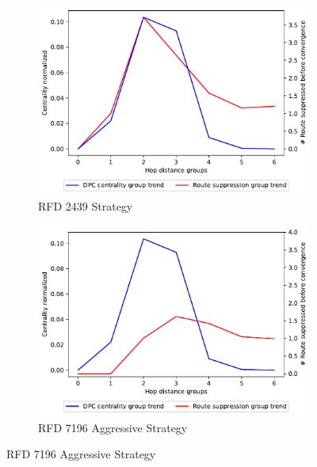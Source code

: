 \begin{figure}[h]
     \centering
     \begin{subfigure}[b]{0.49\textwidth}
         \centering
         \includegraphics[width=\textwidth]{images/RFD/miceVSelephants/mice/cisco_1000_RFD_nodeConvergence_centVSsup_trend.pdf}
         \caption{RFD 2439 Strategy}
         \label{fig:1000_2439RFD_centVSsup}
     \end{subfigure}
     \hfill
     \begin{subfigure}[b]{0.49\textwidth}
         \centering
         \includegraphics[width=\textwidth]{images/RFD/miceVSelephants/mice/cisco_1000_RFD_7196_aggressive_nodeConvergence_centVSsup_trend.pdf}
         \caption{RFD 7196 Aggressive Strategy}
         \label{fig:1000_7196RFDA_centVSsup}
     \end{subfigure}

\end{figure}
